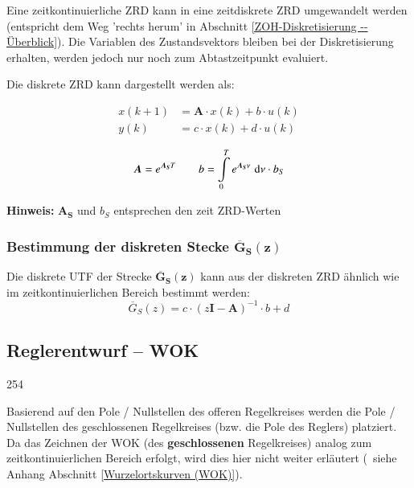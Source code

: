 Eine zeitkontinuierliche ZRD kann in eine zeitdiskrete ZRD umgewandelt werden (entspricht dem Weg 'rechts herum' in Abschnitt \ref{ZOH-Diskretisierung -- Überblick}).
Die Variablen des Zustandsvektors bleiben bei der Diskretisierung erhalten, werden jedoch nur noch zum Abtastzeitpunkt evaluiert.

\smallskip

Die diskrete ZRD kann dargestellt werden als:

\vspace{-0.2cm}

\begin{minipage}[c]{0.4\columnwidth}
    \begin{align*}
        x(k+1)  &= \bm{A} \cdot x(k) + b \cdot u(k) \\
        y(k)    &= c \cdot x(k) + d \cdot u(k)
    \end{align*}
\end{minipage}
\hfill
\begin{minipage}[c]{0.58\columnwidth}
    \[
        \bm{A}  = e^{\bm{A_S} T} \qquad
        b       = \int\limits_0^T e^{\bm{A_S} \nu} \, \mathop{} \! \mathrm{d} \nu \cdot b_S
    \]
\end{minipage}

\smallskip

\textbf{Hinweis:} $\bm{A_S}$ und $b_S$ entsprechen den zeit ZRD-Werten 


\subsubsection{Bestimmung der diskreten Stecke $\bm{\overline{G}_S(z)}$}

Die diskrete UTF der Strecke $\bm{\overline{G}_S(z)}$ kann aus der diskreten ZRD ähnlich wie im zeitkontinuierlichen Bereich bestimmt werden:
\vspace{-0.2cm}
$$ \overline{G}_S(z) = c \cdot (z \bm{I} - \bm{A})^{-1} \cdot b + d $$


\subsection{Reglerentwurf -- WOK}{254}

Basierend auf den Pole / Nullstellen des offeren Regelkreises werden die Pole / Nullstellen des geschlossenen Regelkreises (bzw. die Pole des Reglers) platziert.
Da das Zeichnen der WOK (des \textbf{geschlossenen} Regelkreises) analog zum zeitkontinuierlichen Bereich erfolgt, wird dies hier nicht weiter erläutert (\textrightarrow\ siehe Anhang Abschnitt \ref{Wurzelortskurven (WOK)}).

